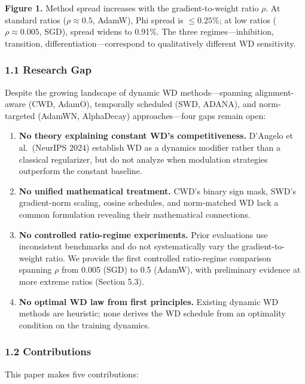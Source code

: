 \documentclass[
]{article}
\begin{document}
\textbf{Figure 1.} Method spread increases with the gradient-to-weight
ratio \(\rho\). At standard ratios (\(\rho \approx 0.5\), AdamW), Phi
spread is \(\leq 0.25\%\); at low ratios (\(\rho \approx 0.005\), SGD),
spread widens to 0.91\%. The three regimes---inhibition, transition,
differentiation---correspond to qualitatively different WD sensitivity.

\hypertarget{research-gap}{%
\subsubsection{1.1 Research Gap}\label{research-gap}}

Despite the growing landscape of dynamic WD methods---spanning
alignment-aware (CWD, AdamO), temporally scheduled (SWD, ADANA), and
norm-targeted (AdamWN, AlphaDecay) approaches---four gaps remain open:

\begin{enumerate}
\def\labelenumi{\arabic{enumi}.}
\item
  \textbf{No theory explaining constant WD's competitiveness.} D'Angelo
  et al.~(NeurIPS 2024) establish WD as a dynamics modifier rather than
  a classical regularizer, but do not analyze when modulation strategies
  outperform the constant baseline.
\item
  \textbf{No unified mathematical treatment.} CWD's binary sign mask,
  SWD's gradient-norm scaling, cosine schedules, and norm-matched WD
  lack a common formulation revealing their mathematical connections.
\item
  \textbf{No controlled ratio-regime experiments.} Prior evaluations use
  inconsistent benchmarks and do not systematically vary the
  gradient-to-weight ratio. We provide the first controlled ratio-regime
  comparison spanning \(\rho\) from 0.005 (SGD) to 0.5 (AdamW), with
  preliminary evidence at more extreme ratios (Section 5.3).
\item
  \textbf{No optimal WD law from first principles.} Existing dynamic WD
  methods are heuristic; none derives the WD schedule from an optimality
  condition on the training dynamics.
\end{enumerate}

\hypertarget{contributions}{%
\subsubsection{1.2 Contributions}\label{contributions}}

This paper makes five contributions:
\end{document}
